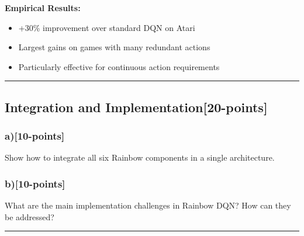 \documentclass[12pt]{article}
\begin{document}
{{\textbf{Empirical Results:}
\begin{itemize}
\item +30\% improvement over standard DQN on Atari
\item Largest gains on games with many redundant actions
\item Particularly effective for continuous action requirements
\end{itemize}

\noindent\rule{\textwidth}{0.2pt}

\subsection{Integration and Implementation[20-points]}
\subsubsection{a)[10-points]} Show how to integrate all six Rainbow components in a single architecture.

\subsubsection{b)[10-points]} What are the main implementation challenges in Rainbow DQN? How can they be addressed?

\noindent\rule{\textwidth}{0.2pt}
}}


\newpage
\end{document}
